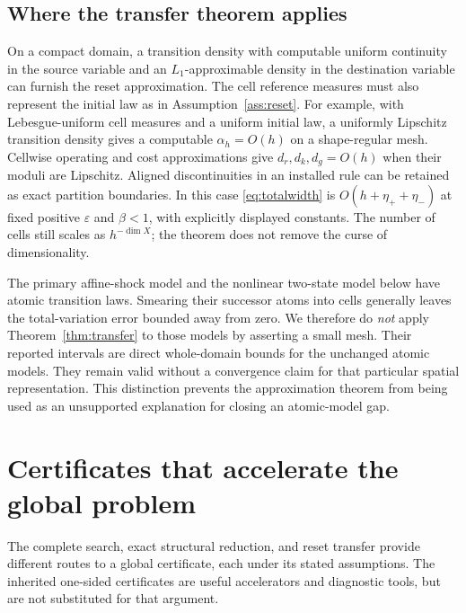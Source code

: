 \subsection{Where the transfer theorem applies}
On a compact domain, a transition density with computable uniform continuity in the source variable and an $L_1$-approximable density in the destination variable can furnish the reset approximation. The cell reference measures must also represent the initial law as in Assumption~\ref{ass:reset}. For example, with Lebesgue-uniform cell measures and a uniform initial law, a uniformly Lipschitz transition density gives a computable $\alpha_h=O(h)$ on a shape-regular mesh. Cellwise operating and cost approximations give $d_r,d_k,d_g=O(h)$ when their moduli are Lipschitz. Aligned discontinuities in an installed rule can be retained as exact partition boundaries. In this case \eqref{eq:totalwidth} is $O(h+\eta_++\eta_-)$ at fixed positive $\varepsilon$ and $\beta<1$, with explicitly displayed constants. The number of cells still scales as $h^{-\dim X}$; the theorem does not remove the curse of dimensionality.

The primary affine-shock model and the nonlinear two-state model below have atomic transition laws. Smearing their successor atoms into cells generally leaves the total-variation error bounded away from zero. We therefore do \emph{not} apply Theorem~\ref{thm:transfer} to those models by asserting a small mesh. Their reported intervals are direct whole-domain bounds for the unchanged atomic models. They remain valid without a convergence claim for that particular spatial representation. This distinction prevents the approximation theorem from being used as an unsupported explanation for closing an atomic-model gap.

\section{Certificates that accelerate the global problem}\label{sec:certificates}
The complete search, exact structural reduction, and reset transfer provide different routes to a global certificate, each under its stated assumptions. The inherited one-sided certificates are useful accelerators and diagnostic tools, but are not substituted for that argument.

